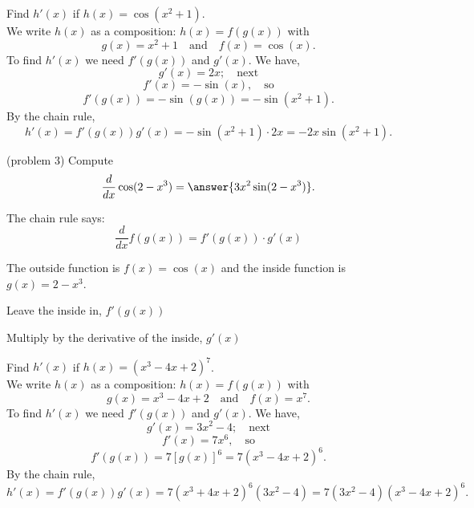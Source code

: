 \documentclass{ximera}
\begin{document}
\begin{example}[example 3]
Find $h'(x)$ if $h(x) = \cos(x^2 + 1)$.\\
We write $h(x)$ as a composition: $h(x)=f(g(x))$ with
\[
g(x) = x^2 + 1  \quad \text{and} \quad  f(x) = \cos(x).
\]
To find $h'(x)$ we need $f'(g(x))$ and $g'(x)$. We have,
\[
g'(x) = 2x; \quad \text{next}
\]
\[
f'(x) = -\sin(x), \quad \text{so}
\]
\[
f'(g(x))= -\sin(g(x)) = -\sin(x^2 + 1).
\]
By the chain rule,
\[
h'(x) = f'(g(x))g'(x) = -\sin(x^2 + 1) \cdot 2x = -2x\sin(x^2 + 1).
\]

\end{example}


\begin{center}
\begin{foldable}
\end{foldable}
\end{center}

\begin{problem}(problem 3)
  Compute
  \[
  \frac{d}{dx} \cos(2-x^3) = \answer{3x^2\sin(2-x^3)}.
  \]
  
    \begin{hint}
      The chain rule says:
      \[
      \frac{d}{dx} f(g(x)) = f'(g(x))\cdot g'(x)
      \]
    \end{hint}
    \begin{hint}
      The outside function is $f(x) = \cos(x)$ and the inside
      function is $g(x) = 2-x^3$.
    \end{hint}
    \begin{hint}
		  Leave the inside in, $f'(g(x))$
		\end{hint}
		\begin{hint}
		  Multiply by the derivative of the inside, $g'(x)$
		\end{hint}
    
\end{problem}



\begin{example}[example 4]

Find $h'(x)$ if $h(x) = (x^3 - 4x + 2)^7$.\\
We write $h(x)$ as a composition: $h(x)=f(g(x))$ with 
\[
g(x) = x^3 - 4x + 2  \quad \text{and} \quad  f(x) = x^7.
\]
To find $h'(x)$ we need $f'(g(x))$ and $g'(x)$.  We have,
\[
g'(x) =3x^2 - 4; \quad \text{next} 
\]
\[
f'(x) = 7x^6 , \quad \text{so}
\]
\[
f'(g(x)) = 7[g(x)]^6 = 7(x^3 - 4x + 2)^6 .
\]
By the chain rule,
\[
h'(x) = f'(g(x))g'(x) = 7(x^3 + 4x + 2)^6(3x^2 - 4)=7(3x^2 - 4)(x^3 - 4x + 2)^6.
\]
\end{example}
\end{document}
